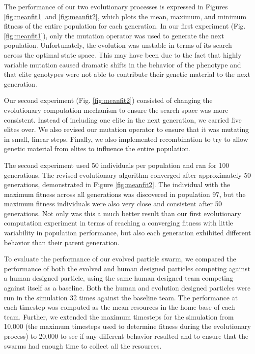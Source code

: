 \documentclass[conference,final]{IEEEtran}
\begin{document}
The performance of our two evolutionary processes is expressed in Figures \ref{fig:meanfit1} and \ref{fig:meanfit2}, which plots the mean, maximum, and minimum fitness of the entire population for each generation. In our first experiment (Fig. \ref{fig:meanfit1}), only the mutation operator was used to generate the next population. Unfortunately, the evolution was unstable in terms of its search across the optimal state space. This may have been due to the fact that highly variable mutation caused dramatic shifts in the behavior of the phenotype and that elite genotypes were not able to contribute their genetic material to the next generation.

Our second experiment (Fig. \ref{fig:meanfit2}) consisted of changing the evolutionary computation mechanism to ensure the search space was more consistent. Instead of including one elite in the next generation, we carried five elites over. We also revised our mutation operator to ensure that it was mutating in small, linear steps. Finally, we also implemented recombination to try to allow genetic material from elites to influence the entire population. 

The second experiment used 50 individuals per population and ran for 100 generations. The revised evolutionary algorithm converged after approximately 50 generations, demonstrated in Figure \ref{fig:meanfit2}. The individual with the maximum fitness across all generations was discovered in population 97, but the maximum fitness individuals were also very close and consistent after 50 generations. Not only was this a much better result than our first evolutionary computation experiment in terms of reaching a converging fitness with little variability in population performance, but also each generation exhibited different behavior than their parent generation.

To evaluate the performance of our evolved particle swarm, we compared the performance of both the evolved and human designed particles competing against a human designed particle, using the same human designed team competing against itself as a baseline. Both the human and evolution designed particles were run in the simulation 32 times against the baseline team. The performance at each timestep was computed as the mean resources in the home base of each team. Further, we extended the maximum timesteps for the simulation from 10,000 (the maximum timesteps used to determine fitness during the evolutionary process) to 20,000 to see if any different behavior resulted and to ensure that the swarms had enough time to collect all the resources. 
\end{document}

